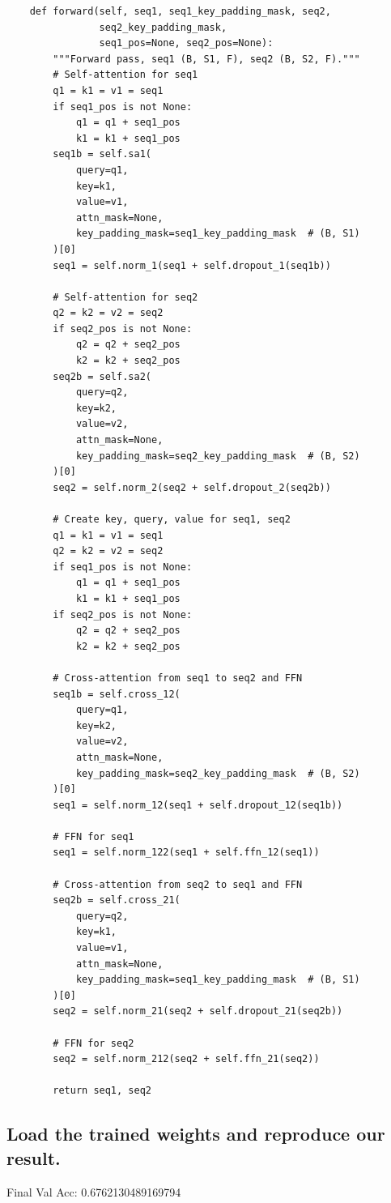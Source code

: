 \documentclass{article}
\begin{document}
\begin{lstlisting}
    def forward(self, seq1, seq1_key_padding_mask, seq2,
                seq2_key_padding_mask,
                seq1_pos=None, seq2_pos=None):
        """Forward pass, seq1 (B, S1, F), seq2 (B, S2, F)."""
        # Self-attention for seq1
        q1 = k1 = v1 = seq1
        if seq1_pos is not None:
            q1 = q1 + seq1_pos
            k1 = k1 + seq1_pos
        seq1b = self.sa1(
            query=q1,
            key=k1,
            value=v1,
            attn_mask=None,
            key_padding_mask=seq1_key_padding_mask  # (B, S1)
        )[0]
        seq1 = self.norm_1(seq1 + self.dropout_1(seq1b))

        # Self-attention for seq2
        q2 = k2 = v2 = seq2
        if seq2_pos is not None:
            q2 = q2 + seq2_pos
            k2 = k2 + seq2_pos
        seq2b = self.sa2(
            query=q2,
            key=k2,
            value=v2,
            attn_mask=None,
            key_padding_mask=seq2_key_padding_mask  # (B, S2)
        )[0]
        seq2 = self.norm_2(seq2 + self.dropout_2(seq2b))

        # Create key, query, value for seq1, seq2
        q1 = k1 = v1 = seq1
        q2 = k2 = v2 = seq2
        if seq1_pos is not None:
            q1 = q1 + seq1_pos
            k1 = k1 + seq1_pos
        if seq2_pos is not None:
            q2 = q2 + seq2_pos
            k2 = k2 + seq2_pos

        # Cross-attention from seq1 to seq2 and FFN
        seq1b = self.cross_12(
            query=q1,
            key=k2,
            value=v2,
            attn_mask=None,
            key_padding_mask=seq2_key_padding_mask  # (B, S2)
        )[0]
        seq1 = self.norm_12(seq1 + self.dropout_12(seq1b))

        # FFN for seq1
        seq1 = self.norm_122(seq1 + self.ffn_12(seq1))

        # Cross-attention from seq2 to seq1 and FFN
        seq2b = self.cross_21(
            query=q2,
            key=k1,
            value=v1,
            attn_mask=None,
            key_padding_mask=seq1_key_padding_mask  # (B, S1)
        )[0]
        seq2 = self.norm_21(seq2 + self.dropout_21(seq2b))

        # FFN for seq2
        seq2 = self.norm_212(seq2 + self.ffn_21(seq2))

        return seq1, seq2
\end{lstlisting}

\subsection{Load the trained weights and reproduce our result.}
Final Val Acc: 0.6762130489169794
\end{document}
